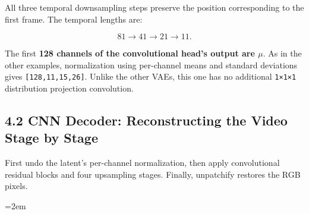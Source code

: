 \documentclass[
  11pt,
  a4paper,
]{article}
\newcommand{\NotesTableStyle}{\linespread{1}\fontsize{9.5pt}{13pt}\selectfont\setlength{\tabcolsep}{4pt}\renewcommand{\arraystretch}{1.1}\setlength{\extrarowheight}{5pt}\setlength{\LTpre}{5pt}\setlength{\LTpost}{6pt}\setlength{\parskip}{0pt}\emergencystretch=2em}
\begin{document}
\endgroup

All three temporal downsampling steps preserve the position
corresponding to the first frame. The temporal lengths are:

\[
81\rightarrow41\rightarrow21\rightarrow11.
\]

The first \textbf{128 channels of the convolutional head's output are
\(\mu\)}. As in the other examples, normalization using per-channel
means and standard deviations gives \texttt{{[}128,11,15,26{]}}. Unlike
the other VAEs, this one has no additional \texttt{1×1×1} distribution
projection convolution.

\clearpage

\subsection{4.2 CNN Decoder: Reconstructing the Video Stage by
Stage}\label{ltx25-conv-decoder}

First undo the latent's per-channel normalization, then apply
convolutional residual blocks and four upsampling stages. Finally,
unpatchify restores the RGB pixels.

\begingroup\NotesTableStyle\fontsize{10pt}{12pt}\selectfont\renewcommand{\arraystretch}{1.02}\setlength{\extrarowheight}{1pt}
\end{document}
